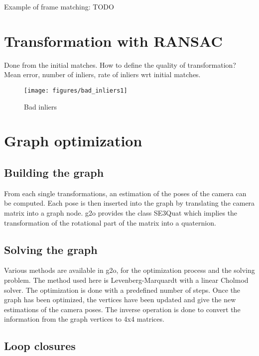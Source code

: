 Example of frame matching: TODO

\section{Transformation with RANSAC}

Done from the initial matches.
How to define the quality of transformation? 
Mean error, number of inliers, rate of inliers wrt initial matches.

\begin{figure}[h]
\centering
\texttt{[image: figures/bad\_inliers1]}
\caption{Bad inliers}
\end{figure}

\section{Graph optimization}
\subsection{Building the graph}

From each single transformations, an estimation of the poses of the camera can be computed. Each pose is then inserted into the graph by translating the camera matrix into a graph node. g2o provides the class SE3Quat which implies the transformation of the rotational part of the matrix into a quaternion.

\subsection{Solving the graph}

Various methods are available in g2o, for the optimization process and the solving problem. The method used here is Levenberg-Marquardt with a linear Cholmod solver. The optimization is done with a predefined number of steps. Once the graph has been optimized, the vertices have been updated and give the new estimations of the camera poses. The inverse operation is done to convert the information from the graph vertices to 4x4 matrices.

\subsection{Loop closures}

